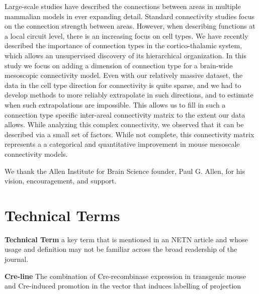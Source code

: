 \documentclass[NETN,manuscript]{stjour-new}
\begin{document}
\begin{authorsummary}
Large-scale studies have described the connections between areas in multiple mammalian models in ever expanding detail.
Standard connectivity studies focus on the connection strength between areas.
However, when describing functions at a local circuit level, there is an increasing focus on cell types.
We have recently described the importance of connection types in the cortico-thalamic system, which allows an unsupervised discovery of its hierarchical organization.
In this study we focus on adding a dimension of connection type for a brain-wide mesoscopic connectivity model.
Even with our relatively massive dataset, the data in the cell type direction for connectivity is quite sparse, and we had to develop methods to more reliably extrapolate in such directions, and to estimate when such extrapolations are impossible.
This allows us to fill in such a connection type specific inter-areal connectivity matrix to the extent our data allows. 
While analyzing this complex connectivity, we observed that it can be described via a small set of factors. 
While not complete, this connectivity matrix represents a a categorical and quantitative improvement in mouse mesoscale connectivity models. 

\end{authorsummary}

\newpage


\newpage

\newpage

\newpage


\newpage

\acknowledgments
We thank the Allen Institute for Brain Science founder, Paul G. Allen, for his vision, encouragement, and support.
\newpage



\newpage


\newpage
\section{Technical Terms}

\textbf{Technical Term} a key term that is mentioned in an NETN article and whose usage and definition may not be familiar across the broad readership of the journal. 

\textbf{Cre-line}  The combination of Cre-recombinase expression in transgenic mouse and Cre-induced promotion in the vector that induces labelling of projection
\end{document}
